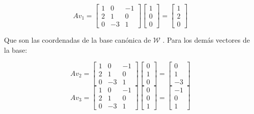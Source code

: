 \begin{equation*}
A v_1 =  \left[ \begin{array}{ccc}
    1 & 0 & -1\\
    2 & 1 & 0\\
    0 & -3 & 1
\end{array}
\right] \left[ \begin{array}{c}
    1 \\
    0 \\
    0 
\end{array}
\right] = \left[ \begin{array}{c}
    1 \\
    2 \\
    0 
\end{array}
\right]
\end{equation*}

Que son las coordenadas de la base canónica de $\mathcal{W}$ . Para los demás vectores de la base:

\begin{equation*}
A v_2 =  \left[ \begin{array}{ccc}
    1 & 0 & -1\\
    2 & 1 & 0\\
    0 & -3 & 1
\end{array}
\right] \left[ \begin{array}{c}
    0 \\
    1 \\
    0 
\end{array}
\right] = \left[ \begin{array}{c}
    0 \\
    1 \\
    -3 
\end{array}
\right]
\end{equation*}
\begin{equation*}
A v_3 =  \left[ \begin{array}{ccc}
    1 & 0 & -1\\
    2 & 1 & 0\\
    0 & -3 & 1
\end{array}
\right] \left[ \begin{array}{c}
    0 \\
    0 \\
    1 
\end{array}
\right] = \left[ \begin{array}{c}
    -1 \\
    0 \\
    1 
\end{array}
\right]
\end{equation*}


